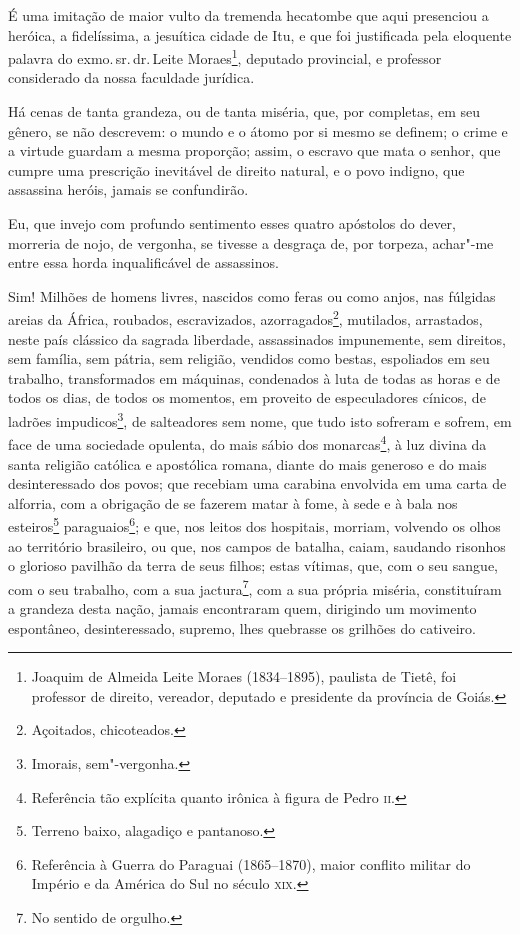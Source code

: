 É uma imitação de maior vulto da tremenda hecatombe que aqui presenciou
a heróica, a fidelíssima, a jesuítica cidade de Itu, e que foi
justificada pela eloquente palavra do exmo.\,sr.\,dr.\,Leite
Moraes\footnote{Joaquim de Almeida Leite Moraes (1834--1895), paulista
  de Tietê, foi professor de direito, vereador, deputado e presidente da
  província de Goiás.}, deputado provincial, e professor considerado da
nossa faculdade jurídica.

Há cenas de tanta grandeza, ou de tanta miséria, que, por completas, em
seu gênero, se não descrevem: o mundo e o átomo por si mesmo se definem;
o crime e a virtude guardam a mesma proporção; assim, o escravo que mata
o senhor, que cumpre uma prescrição inevitável de direito natural, e o
povo indigno, que assassina heróis, jamais se confundirão.

Eu, que invejo com profundo sentimento esses quatro apóstolos do dever,
morreria de nojo, de vergonha, se tivesse a desgraça de, por torpeza,
achar"-me entre essa horda inqualificável de assassinos.

Sim! Milhões de homens livres, nascidos como feras ou como anjos, nas
fúlgidas areias da África, roubados, escravizados, azorragados\footnote{
  Açoitados, chicoteados.}, mutilados, arrastados, neste país clássico
da sagrada liberdade, assassinados impunemente, sem direitos, sem
família, sem pátria, sem religião, vendidos como bestas, espoliados em
seu trabalho, transformados em máquinas, condenados à luta de todas as
horas e de todos os dias, de todos os momentos, em proveito de
especuladores cínicos, de ladrões impudicos\footnote{Imorais,
  sem"-vergonha.}, de salteadores sem nome, que tudo isto sofreram e
sofrem, em face de uma sociedade opulenta, do mais sábio dos
monarcas\footnote{Referência tão explícita quanto irônica à figura de
  Pedro \textsc{ii}.}, à luz divina da santa religião católica e apostólica
romana, diante do mais generoso e do mais desinteressado dos povos; que
recebiam uma carabina envolvida em uma carta de alforria, com a
obrigação de se fazerem matar à fome, à sede e à bala nos
esteiros\footnote{Terreno baixo, alagadiço e pantanoso.}
paraguaios\footnote{Referência à Guerra do Paraguai (1865--1870), maior
  conflito militar do Império e da América do Sul no século \textsc{xix}.}; e
que, nos leitos dos hospitais, morriam, volvendo os olhos ao território
brasileiro, ou que, nos campos de batalha, caiam, saudando risonhos o
glorioso pavilhão da terra de seus filhos; estas vítimas, que, com o seu
sangue, com o seu trabalho, com a sua jactura\footnote{No sentido de
  orgulho.}, com a sua própria miséria, constituíram a grandeza desta
nação, jamais encontraram quem, dirigindo um movimento espontâneo,
desinteressado, supremo, lhes quebrasse os grilhões do cativeiro.

